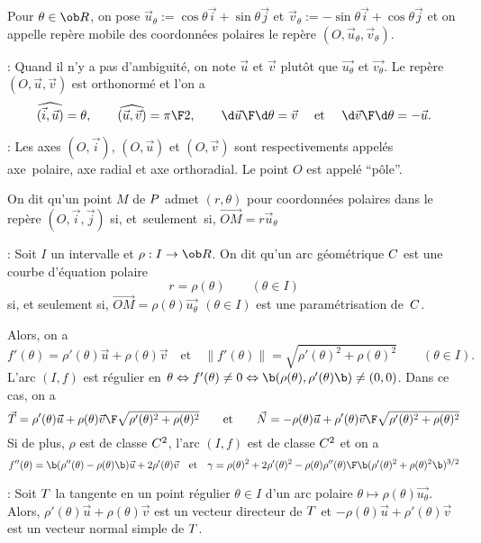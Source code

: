 \Definition Pour $\theta\in\ob R$, on pose $\vec u_\theta:=\cos\theta\vec i+\sin\theta\vec j$ et 
$\vec v_\theta:=-\sin\theta\vec i+\cos\theta\vec j$ et on appelle repère mobile 
des coordonnées polaires le repère $(O, \vec u_\theta,\vec v_\theta)$. 
\bigskip

\Remarque : Quand il n'y a pas d'ambiguité, on note $\vec u$ et $\vec v$ plutôt 
que $\vec{u_\theta}$ et $\vec{v _\theta}$. \pn
Le repère $(O,\vec u,\vec v)$ est orthonormé et l'on a 
$$
\widehat{(\vec i,\vec u)}=\theta,\qquad \widehat{(\vec u,\vec v)}={\pi\F2}, \qquad {\d \vec u\F\d\theta}=\vec v
\quad\mbox{ et }
\quad{\d \vec v\F\d\theta}=-\vec u. 
$$

\Remarque : Les axes $(O,\vec i)$, $(O,\vec u)$ et $(O,\vec v)$ sont respectivements 
appelés axe~polaire, axe radial et axe orthoradial. 
Le point $O$ est appelé ``pôle''. 
\bigskip

\Definition On dit qu'un point $M$ de $\sc P$ 
admet $(r,\theta)$ pour coordonnées polaires dans le repère $(O, \vec i,\vec j)$ si, 
et~seulement~si, $\vec {OM}=r\vec u_{\theta}$
\bigskip

\Remarque : Soit $I$ un intervalle et $\rho:I\to\ob R$. 
On dit qu'un arc géométrique $\sc C$ est une courbe d'équation polaire 
$$
r=\rho(\theta)\qquad(\theta\in I)
$$
si, et seulement si, $\vec{OM}=\rho(\theta)\vec{u_\theta}\ \,(\theta\in I)$ 
est une paramétrisation de~$\sc C$. 
\bigskip

Alors, on a 
$$
f'(\theta)=\rho'(\theta)\vec u+\rho(\theta)\vec v \quad\mbox{et}\quad \|f'(\theta)\|=\sqrt{\rho'(\theta)^2+\rho(\theta)^2}
\qquad(\theta\in I).
$$ 
L'arc $(I,f)$ est régulier en 
$\theta \Leftrightarrow f'(\theta)\neq 0 \Leftrightarrow \b(\rho(\theta),\rho'(\theta)\b)
\neq (0,0)$. Dans ce cas, on a 
$$
\vec T={\rho'(\theta)\vec u+\rho(\theta)\vec v\F\sqrt{\rho'(\theta)^2+\rho(\theta)^2}}
\qquad\mbox{et}\qquad \vec N={-\rho(\theta)\vec u+\rho'(\theta)\vec v\F\sqrt{\rho'(\theta)^2+\rho(\theta)^2}}
$$ 
Si de plus, $\rho$ est de classe $\sc C^2$, l'arc $(I,f)$ est de classe $\sc C^2$ et on a 
$$
f''(\theta)=\b(\rho''(\theta)-\rho(\theta)\b)\vec u+2\rho'(\theta)\vec v \quad\mbox{et}\quad 
\gamma={\rho(\theta)^2+2\rho'(\theta)^2-\rho(\theta)\rho''(\theta)\F\b(\rho'(\theta)^2+\rho(\theta)^2\b)^{3/2}}
$$

\Remarque : Soit $\sc T$ la tangente en un point régulier $\theta\in I$ 
d'un arc polaire $\theta\mapsto\rho(\theta)\vec{u_{\theta}}$. Alors, 
$\rho'(\theta)\vec u+\rho(\theta)\vec v$ est un vecteur directeur de $\sc T$ et 
$-\rho(\theta)\vec u+\rho'(\theta)\vec v$ est un vecteur normal simple de $\sc T$. 
\bigskip

